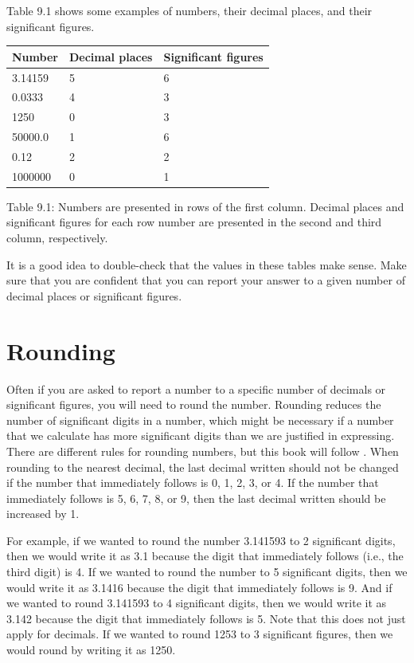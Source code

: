 \documentclass[
  openany]{scrbook}
\begin{document}
Table 9.1 shows some examples of numbers, their decimal places, and their significant figures.

\begin{longtable}[]{@{}lll@{}}
\toprule
Number & Decimal places & Significant figures \\
\midrule
\endhead
3.14159 & 5 & 6 \\
0.0333 & 4 & 3 \\
1250 & 0 & 3 \\
50000.0 & 1 & 6 \\
0.12 & 2 & 2 \\
1000000 & 0 & 1 \\
\bottomrule
\end{longtable}

Table 9.1: Numbers are presented in rows of the first column. Decimal places and significant figures for each row number are presented in the second and third column, respectively.

It is a good idea to double-check that the values in these tables make sense.
Make sure that you are confident that you can report your answer to a given number of decimal places or significant figures.

\hypertarget{rounding}{%
\section{Rounding}\label{rounding}}

Often if you are asked to report a number to a specific number of decimals or significant figures, you will need to round the number.
Rounding reduces the number of significant digits in a number, which might be necessary if a number that we calculate has more significant digits than we are justified in expressing.
There are different rules for rounding numbers, but this book will follow \citet{Sokal1995}.
When rounding to the nearest decimal, the last decimal written should not be changed if the number that immediately follows is 0, 1, 2, 3, or 4.
If the number that immediately follows is 5, 6, 7, 8, or 9, then the last decimal written should be increased by 1.

For example, if we wanted to round the number 3.141593 to 2 significant digits, then we would write it as 3.1 because the digit that immediately follows (i.e., the third digit) is 4.
If we wanted to round the number to 5 significant digits, then we would write it as 3.1416 because the digit that immediately follows is 9.
And if we wanted to round 3.141593 to 4 significant digits, then we would write it as 3.142 because the digit that immediately follows is 5.
Note that this does not just apply for decimals.
If we wanted to round 1253 to 3 significant figures, then we would round by writing it as 1250.
\end{document}
